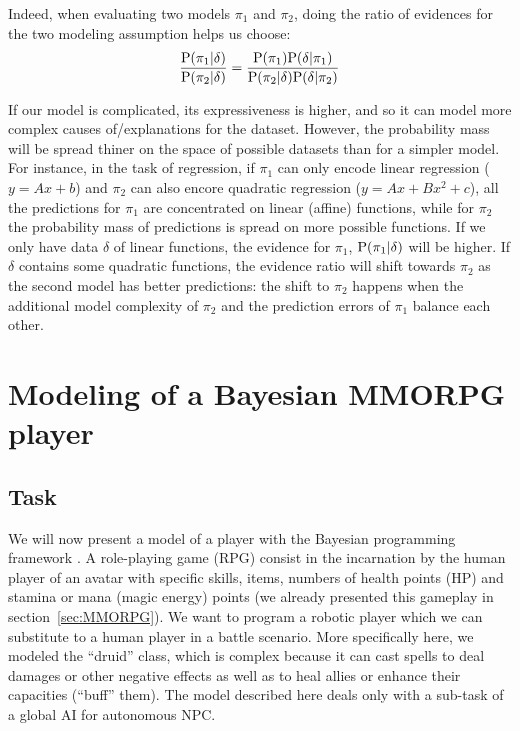 Indeed, when evaluating two models $\pi_1$ and $\pi_2$, doing the ratio of evidences for the two modeling assumption helps us choose:
\begin{equation}
\frac{\mathrm{P}(\pi_1 | \delta)}{\mathrm{P}(\pi_2 | \delta)} = \frac{\mathrm{P}(\pi_1) \mathrm{P}(\delta| \pi_1)}{\mathrm{P}(\pi_2 | \delta) \mathrm{P}(\delta | \pi_2)}
\end{equation}

If our model is complicated, its expressiveness is higher, and so it can model more complex causes of/explanations for the dataset. However, the probability mass will be spread thiner on the space of possible datasets than for a simpler model. For instance, in the task of regression, if $\pi_1$ can only encode linear regression ($y = Ax + b$) and $\pi_2$ can also encore quadratic regression ($y = Ax + Bx^2 + c$), all the predictions for $\pi_1$ are concentrated on linear (affine) functions, while for $\pi_2$ the probability mass of predictions is spread on more possible functions. If we only have data $\delta$ of linear functions, the evidence for $\pi_1$, $\mathrm{P}(\pi_1|\delta)$ will be higher. If $\delta$ contains some quadratic functions, the evidence ratio will shift towards $\pi_2$ as the second model has better predictions: the shift to $\pi_2$ happens when the additional model complexity of $\pi_2$ and the prediction errors of $\pi_1$ balance each other.



\section{Modeling of a Bayesian MMORPG player}
\subsection{Task}

We will now present a model of a  player with the Bayesian programming framework \citep{SYNNAEVE:MMORPG}. A role-playing game (RPG) consist in the incarnation by the human player of an avatar with specific skills, items, numbers of health points (HP) and stamina or mana (magic energy) points (we already presented this gameplay in section~\ref{sec:MMORPG}). We want to program a robotic player which we can substitute to a human player in a battle scenario. More specifically here, we modeled the ``druid'' class, which is complex because it can cast spells to deal damages or other negative effects as well as to heal allies or enhance their capacities (``buff'' them). The model described here deals only with a sub-task of a global AI for autonomous NPC. 

